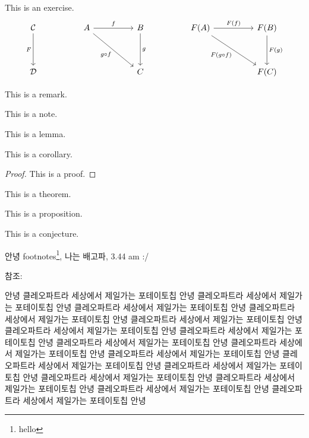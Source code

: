\documentclass[../note.tex]{subfiles}
\begin{document}
\begin{exercise}
  This is an exercise.
  \[\begin{tikzcd}
    \mathcal C \arrow[dd, "F"'] &  & A \arrow[rr, "f"] \arrow[rrdd, "g\circ f"'] &  & B \arrow[dd, "g"] &  & F(A) \arrow[rr, "F(f)"] \arrow[rrdd, "F(g \circ f)"'] &  & F(B) \arrow[dd, "F(g)"] \\
                                &  &                                             &  &                   &  &                                                       &  &                         \\
    \mathcal D                  &  &                                             &  & C                 &  &                                                       &  & F(C)                   
  \end{tikzcd}\]
\end{exercise}
\begin{remark}
  This is a remark.
\end{remark}
\begin{note}
  This is a note.
\end{note}
\begin{lemma}
  This is a lemma.
\end{lemma}
\begin{corollary}
  This is a corollary.
\end{corollary}
\begin{proof}
  This is a proof.
\end{proof}
\begin{theorem}
  This is a theorem.
\end{theorem}
\begin{proposition}
  This is a proposition.
\end{proposition}
\begin{conjecture}
  This is a conjecture.
\end{conjecture}

안녕 footnotes\footnote{hello}, 나는 배고파, 3.44 am :/

참조: \cite{DeterministicNonperiodicFlow}

안녕 클레오파트라 세상에서 제일가는 포테이토칩 안녕 클레오파트라 세상에서 제일가는 포테이토칩 안녕 클레오파트라 세상에서 제일가는 포테이토칩 안녕 클레오파트라 세상에서 제일가는 포테이토칩 안녕 클레오파트라 세상에서 제일가는 포테이토칩 안녕 클레오파트라 세상에서 제일가는 포테이토칩 안녕 클레오파트라 세상에서 제일가는 포테이토칩 안녕 클레오파트라 세상에서 제일가는 포테이토칩 안녕 클레오파트라 세상에서 제일가는 포테이토칩 안녕 클레오파트라 세상에서 제일가는 포테이토칩 안녕 클레오파트라 세상에서 제일가는 포테이토칩 안녕 클레오파트라 세상에서 제일가는 포테이토칩 안녕 클레오파트라 세상에서 제일가는 포테이토칩 안녕 클레오파트라 세상에서 제일가는 포테이토칩 안녕 클레오파트라 세상에서 제일가는 포테이토칩 안녕 클레오파트라 세상에서 제일가는 포테이토칩 안녕 
\end{document}
